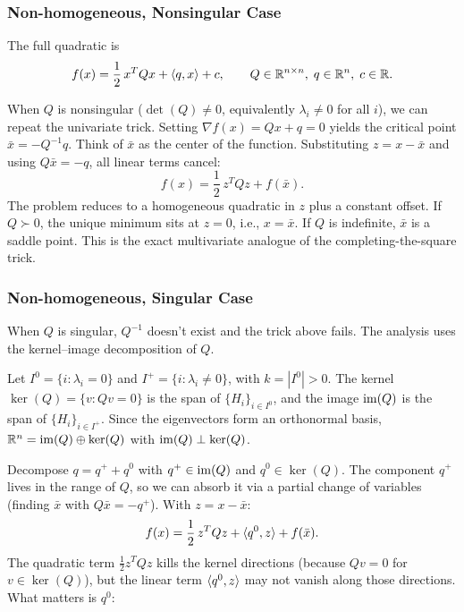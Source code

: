 \subsubsection{Non-homogeneous, Nonsingular Case}\label{ssec:quad-nonhom}

The full quadratic is
\begin{equation}\label{eq:full-quad}
	f(x) = \frac{1}{2}\, x^T Q x + \langle q, x\rangle + c,
	\qquad Q \in \mathbb{R}^{n \times n},\; q \in \mathbb{R}^n,\; c \in \mathbb{R}.
\end{equation}

When $Q$ is nonsingular ($\det(Q) \neq 0$, equivalently $\lambda_i \neq 0$ for all $i$), we can repeat the univariate trick.
Setting $\nabla f(x) = Qx + q = 0$ yields the critical point $\bar{x} = -Q^{-1} q$.
Think of $\bar{x}$ as the center of the function.
Substituting $z = x - \bar{x}$ and using $Q\bar{x} = -q$, all linear terms cancel:
\begin{equation}\label{eq:completing-square-multivariate}
	f(x) = \frac{1}{2}\, z^T Q z + f(\bar{x}).
\end{equation}
The problem reduces to a homogeneous quadratic in $z$ plus a constant offset.
If $Q \succ 0$, the unique minimum sits at $z = 0$, i.e., $x = \bar{x}$.
If $Q$ is indefinite, $\bar{x}$ is a saddle point.
This is the exact multivariate analogue of the completing-the-square trick.

\subsubsection{Non-homogeneous, Singular Case}\label{sssec:opt-quad-singular}

When $Q$ is singular, $Q^{-1}$ doesn't exist and the trick above fails.
The analysis uses the kernel--image decomposition of $Q$.

Let $I^0 = \{i : \lambda_i = 0\}$ and $I^+ = \{i : \lambda_i \neq 0\}$, with $k = |I^0| > 0$.
The kernel $\ker(Q) = \{v : Qv = 0\}$ is the span of $\{H_i\}_{i \in I^0}$, and the image $\operatorname{im}(Q)$ is the span of $\{H_i\}_{i \in I^+}$.
Since the eigenvectors form an orthonormal basis, $\mathbb{R}^n = \operatorname{im}(Q) \oplus \ker(Q)$ with $\operatorname{im}(Q) \perp \ker(Q)$.

Decompose $q = q^+ + q^0$ with $q^+ \in \operatorname{im}(Q)$ and $q^0 \in \ker(Q)$.
The component $q^+$ lives in the range of $Q$, so we can absorb it via a partial change of variables (finding $\bar{x}$ with $Q\bar{x} = -q^+$).
With $z = x - \bar{x}$:
\begin{equation}\label{eq:singular-quad-reduced}
	f(x) = \frac{1}{2}\, z^T Q z + \langle q^0, z\rangle + f(\bar{x}).
\end{equation}
The quadratic term $\frac{1}{2} z^T Q z$ kills the kernel directions (because $Qv = 0$ for $v \in \ker(Q)$), but the linear term $\langle q^0, z\rangle$ may not vanish along those directions.
What matters is $q^0$:

